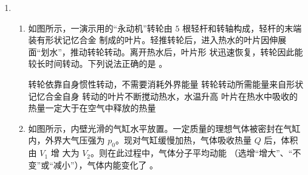 \begin{enumerate}
\begin{enumerate}


\end{enumerate}

\item 
{}
\begin{enumerate}
	\item
如图所示，一演示用的“永动机”转轮由 $ 5 $ 根轻杆和转轴构成，轻杆的末端装有形状记忆合金
制成的叶片。轻推转轮后，进入热水的叶片因伸展面“划水”，推动转轮转动。离开热水后，叶片形
状迅速恢复，转轮因此能较长时间转动。下列说法正确的是 \underlinegap 。
\begin{figure}[h!]
	\centering
	
\end{figure}

\fourchoices
{转轮依靠自身惯性转动，不需要消耗外界能量}
{转轮转动所需能量来自形状记忆合金自身}
{转动的叶片不断搅动热水，水温升高}
{叶片在热水中吸收的热量一定大于在空气中释放的热量}




\item 
如图所示，内壁光滑的气缸水平放置。一定质量的理想气体被密封在气缸
内，外界大气压强为 $ p_{0} $。现对气缸缓慢加热，气体吸收热量 $ Q $ 后，体积由 $ V_{1} $ 增
大为 $ V_{2} $。则在此过程中，气体分子平均动能 \underlinegap （选增“增大”、“不变”或“减小”），气体内能变化了 \underlinegap 。
\begin{figure}[h!]
	\centering
	
\end{figure}



\end{enumerate}





	
	
	
\end{enumerate}

